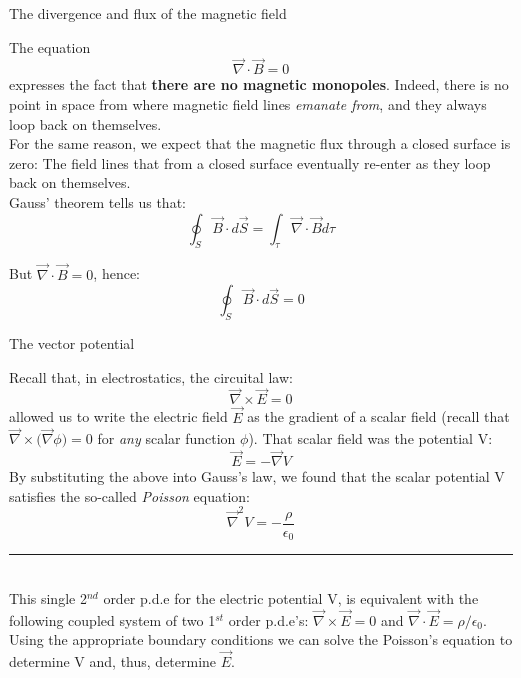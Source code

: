 \begin{frame}{The divergence and flux of the magnetic field}

The equation
\begin{equation*}
         \vec{\nabla} \cdot \vec{B} =  0
\end{equation*}
expresses the fact that {\bf there are no magnetic monopoles}.
Indeed, there is no point in space from where magnetic field lines {\em emanate from},
and they always loop back on themselves.\\

\vspace{0.2cm}
For the same reason, we expect that the magnetic flux through a closed surface is zero:
The field lines that from a closed surface eventually re-enter as they loop back on themselves.\\

Gauss' theorem tells us that:
\begin{equation*}
         \oint_{S} \vec{B} \cdot d\vec{S} = \int_{\tau} \vec{\nabla} \cdot \vec{B} d\tau
\end{equation*}

But $\vec{\nabla} \cdot \vec{B} =  0$, hence:
\begin{equation*}
         \oint_{S} \vec{B} \cdot d\vec{S} = 0
\end{equation*}

\end{frame}

%
%
%

\begin{frame}{The vector potential}

Recall that, in electrostatics, the circuital law:
\begin{equation*}
      \vec{\nabla} \times \vec{E} = 0
\end{equation*}
allowed us to write the electric field $\vec{E}$ as the gradient of a scalar field
(recall that $\vec{\nabla} \times \Big( \vec{\nabla} \phi \Big) =0$
for {\em any} scalar function $\phi$).
That scalar field was the potential V:
\begin{equation*}
      \vec{E} = - \vec{\nabla} V
\end{equation*}
By substituting the above into Gauss's law,
we found that the scalar potential V satisfies the so-called {\em Poisson} equation:
\begin{equation*}
      \vec{\nabla}^{2} V = - \frac{\rho}{\epsilon_0}
\end{equation*}

\noindent\rule{2cm}{0.4pt}\\
{\scriptsize
This single 2$^{nd}$ order p.d.e for the electric potential V, is equivalent with the following coupled system of
two 1$^{st}$ order p.d.e's: $\vec{\nabla} \times \vec{E} = 0$ and  $\vec{\nabla} \cdot \vec{E} = \rho/\epsilon_0$.
Using the appropriate boundary conditions we can solve the Poisson's
equation to determine V and, thus, determine $\vec{E}$.\\
}

\end{frame}

